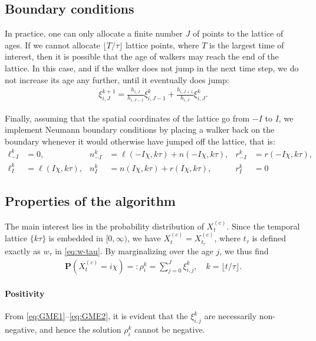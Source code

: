 \documentclass[a4paper,12pt]{elsarticle}
\numberwithin{equation}{section}
\theoremstyle{plain}
\theoremstyle{definition}
\theoremstyle{remark}
\numberwithin{equation}{section}
\newcommand{\tim}{[0,\infty)}
\newcommand{\1}{\mathbf 1}
\newcommand{\pr}{\mathbf P}
\begin{document}
\subsection{Boundary conditions}
In practice, one can only allocate a finite number $J$ of points to the 
lattice of ages.  If we cannot allocate 
$\lfloor T/\tau \rfloor$ lattice points, where $T$ is the largest time of interest, then it is possible that the age of walkers may reach the end of the lattice. In this case, and if the walker does not jump in the next time step, we do not increase its age any further, until it eventually does jump:
\begin{align}
\xi^{k+1}_{i,J} = \frac{h_{i,J}}{h_{i,J-1}} \xi^k_{i,J-1}
+ \frac{h_{i,J+1}}{h_{i,J}} \xi^k_{i,J}.
\end{align}

Finally, assuming that the spatial coordinates of the lattice go from
$-I$ to $I$, we implement Neumann boundary conditions by placing a walker 
back on the boundary whenever it would otherwise have jumped off the lattice, 
that is: 
\begin{align}
  \ell^k_{-I} &= 0, & n^k_{-I} &= \ell(-I\chi, k\tau) + n(-I\chi, k\tau),
  & r^k_{-I} &= r(-I\chi, k\tau),
  \\
  \ell^k_I &= \ell(I \chi, k\tau), & n^k_{I} &= n(I\chi, k\tau) + r(I\chi, k\tau),
  & r^k_{I} &= 0
\end{align}


\subsection{Properties of the algorithm}

The main interest lies in the probability distribution of $X^{(c)}_t$. 
Since the temporal lattice $\{k\tau\}$ is embedded in $\tim$, we have 
$X^{(c)}_t = X^{(c)}_{t_\tau}$, where $t_\tau$ is defined exactly as $w_\tau$ in \eqref{eq:w-tau}.  By marginalizing over the age $j$, we thus find 
\begin{align}
  \pr(X^{(c)}_t = i\chi) =: \rho^k_i = \sum_{j=0}^J \xi^k_{i,j}, 
  \quad k = \lfloor t /\tau \rfloor. 
\end{align}


\paragraph{Positivity}
From \eqref{eq:GME1}--\eqref{eq:GME2}, it is evident that the $\xi^k_{i,j}$ are 
necessarily non-negative, and hence the solution $\rho^k_i$ cannot be negative. 
\end{document}
